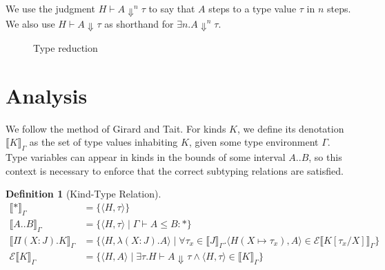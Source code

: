 \documentclass[a4paper, 10pt]{article}
\newcommand{\interval}[2]{#1 .. #2}
\newcommand{\TyKd}{*}
\newcommand{\KDepArr}[3]{\Pi(#1:#2).#3}
\newcommand{\subst}[3]{#1[#2/#3]}
\newcommand{\isval}[1]{#1\ \texttt{val}}
\newcommand{\stepsn}[1][]{\Downarrow^{#1}}
\newcommand{\KDenot}[2][\Gamma]{\llbracket #2 \rrbracket_{#1}}
\newcommand{\KEval}[2][\Gamma]{\mathscr{E}\llbracket #2 \rrbracket_{#1}}
\newtheorem{defn}{Definition}
\begin{document}
We use the judgment $H \vdash A \stepsn[n] \tau$ to say that $A$ steps to a
type value $\tau$ in $n$ steps. We also use $H \vdash A \stepsn \tau$ as
shorthand for $\exists n . A \stepsn[n] \tau$.

\begin{figure}[ht]

  \caption{Type reduction}
\end{figure}

\section{Analysis}

We follow the method of Girard and Tait. For kinds $K$, we define its
denotation $\KDenot{K}$ as the set of type values inhabiting $K$, given some
type environment $\Gamma$. Type variables can appear in kinds in the bounds of
some interval $\interval{A}{B}$, so this context is necessary to enforce that
the correct subtyping relations are satisfied.

\begin{defn}[Kind-Type Relation]
  \begin{align*}
    \KDenot{\TyKd} &= \{ \langle H, \tau \rangle \} \\
    \KDenot{\interval{A}{B}} &=
      \{ \langle H, \tau \rangle \mid
         \Gamma \vdash A \le B : \TyKd
      \} \\
    \KDenot{\KDepArr{X}{J}{K}} &=
      \{ \langle H, \lambda(X:J).A \rangle \mid
         \forall \tau_x \in \KDenot{J} .
           \langle H(X \mapsto \tau_x), A \rangle \in
           \KEval[\Gamma]{\subst{K}{\tau_x}{X}}
      \} \\
    \KEval{K} &=
      \{ \langle H, A \rangle \mid
         \exists \tau .
           H \vdash A \stepsn \tau \land
           \langle H, \tau \rangle \in \KDenot{K}
      \}
  \end{align*}
\end{defn}
\end{document}
